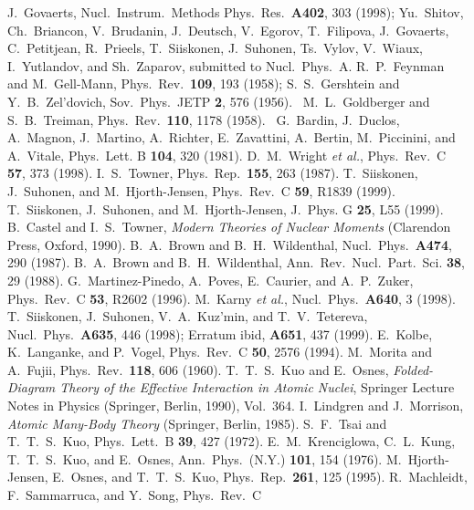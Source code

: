 \begin{thebibliography}{00}
 J.~Govaerts, Nucl.~Instrum.~Methods Phys.~Res.~{\bf A402},
  303 (1998);
  Yu.~Shitov, Ch.~Briancon, V.~Brudanin, J.~Deutsch, V.~Egorov,
  T.~Filipova, J.~Govaerts, C.~Petitjean, R.~Prieels, T.~Siiskonen,
  J.~Suhonen, Ts.~Vylov, V.~Wiaux, I.~Yutlandov, and Sh.~Zaparov,
  submitted to Nucl.~Phys.~A.
 R.~P.~Feynman and M.~Gell-Mann, Phys.~Rev.~{\bf 109}, 193 (1958);
  S.~S.~Gershtein and Y.~B.~Zel'dovich, Sov.~Phys.~JETP {\bf 2}, 
  576 (1956).~
 M.~L.~Goldberger and S.~B.~Treiman, Phys.~Rev.~{\bf 110},
  1178 (1958).~ 
 G.~Bardin, J.~Duclos, A.~Magnon, J.~Martino, A.~Richter,
  E.~Zavattini, A.~Bertin, M.~Piccinini, and A.~Vitale, Phys.~Lett.
  B {\bf 104}, 320 (1981).
 D.~M.~Wright {\em et al.}, Phys.~Rev.~C {\bf 57}, 373 (1998).
 I.~S.~Towner, Phys.~Rep.~{\bf 155}, 263 (1987).
 T.~Siiskonen, J.~Suhonen, and M.~Hjorth-Jensen,
  Phys.~Rev.~C {\bf 59}, R1839 (1999).
 T.~Siiskonen, J.~Suhonen, and M.~Hjorth-Jensen, J.~Phys.
  G {\bf 25}, L55 (1999).
 B.~Castel and I.~S.~Towner, {\em Modern Theories
    of Nuclear Moments} (Clarendon Press, Oxford, 1990).
 B.~A.~Brown and B.~H.~Wildenthal, Nucl.~Phys.~{\bf A474},
  290 (1987).
 B.~A.~Brown and B.~H.~Wildenthal, Ann.~Rev.~Nucl.~Part.~Sci.
  {\bf 38}, 29 (1988).
 G.~Martinez-Pinedo, A.~Poves, E.~Caurier, and A.~P.~Zuker,
  Phys.~Rev.~C {\bf 53}, R2602 (1996).
 M.~Karny {\em et al.}, Nucl.~Phys.~{\bf A640}, 3 (1998).
 T.~Siiskonen, J.~Suhonen, V.~A.~Kuz'min, and
  T.~V.~Tetereva, Nucl.~Phys.~{\bf A635}, 446 (1998);
  Erratum ibid, {\bf A651}, 437 (1999).
 E.~Kolbe, K.~Langanke, and P.~Vogel, Phys.~Rev.~C {\bf 50},
  2576 (1994).
 M.~Morita and A.~Fujii, Phys.~Rev.~{\bf 118}, 606 (1960).
 T.~T.~S.~Kuo and E.~Osnes, {\em Folded-Diagram Theory
of the Effective Interaction in Atomic Nuclei}, Springer Lecture
Notes in Physics (Springer, Berlin, 1990), Vol.~364.
  I.~Lindgren and J.~Morrison, {\em Atomic Many-Body Theory}
  (Springer, Berlin, 1985).
 S.~F.~Tsai and T.~T.~S.~Kuo, Phys.~Lett.~B {\bf 39}, 427 (1972).
 E.~M.~Krenciglowa, C.~L.~Kung, T.~T.~S.~Kuo, and
  E.~Osnes, Ann.~Phys.~(N.Y.) {\bf 101}, 154 (1976).
 M.~Hjorth-Jensen, E.~Osnes, and T.~T.~S.~Kuo,
  Phys.~Rep.~{\bf 261}, 125 (1995).
 R.~Machleidt, F.~Sammarruca, and Y.~Song, Phys.~Rev.~C 

\end{thebibliography}
